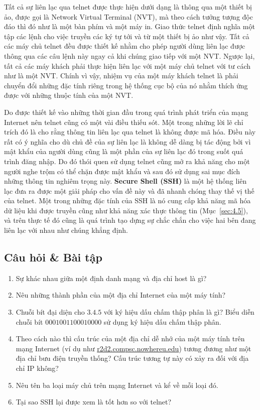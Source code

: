Tất cả sự liên lạc qua telnet được thực hiện dưới dạng là thông qua một thiết bị ảo, được
gọi là Network Virtual Terminal (NVT), mà theo cách tưởng tượng độc đáo thì đó như là một
bàn phím và một máy in. Giao thức telnet định nghĩa một tập các lệnh cho việc truyền các
ký tự tới và từ một thiết bị ảo như vậy. Tất cả các máy chủ telnet đều được thiết kế nhằm
cho phép người dùng liên lạc được thông qua các câu lệnh này ngay cả khi chúng giao tiếp
với một NVT. Ngược lại, tất cả các máy khách phải thực hiện liên lạc với một máy chủ
telnet với tư cách như là một NVT. Chính vì vậy, nhiệm vụ của một máy khách telnet là phải
chuyển đổi những đặc tính riêng trong hệ thống cục bộ của nó nhằm thích ứng được với những
thuộc tính của một NVT.

Do được thiết kế vào những thời gian đầu trong quá trình phát triển của mạng Internet nên
telnet cũng có một vài điều thiếu sót. Một trong những lời lẽ chỉ trích đó là cho rằng
thông tin liên lạc qua telnet là không được mã hóa. Điều này rất có ý nghĩa cho dù chủ đề
của sự liên lạc là không dễ dàng bị tác động bởi vì mật khẩu của người dùng cũng là một
phần của sự liên lạc đó trong suốt quá trình đăng nhập. Do đó thói quen sử dụng telnet
cũng mở ra khả năng cho một người nghe trộm có thể chặn được mật khẩu và sau đó sử dụng
sai mục đích những thông tin nghiêm trọng này. \textbf{Secure Shell (SSH)} là một hệ thống
liên lạc đưa ra được một giải pháp cho vấn đề này và đã nhanh chóng thay thế vị thế của
telnet. Một trong những đặc tính của SSH là nó cung cấp khả năng mã hóa dữ liệu khi được
truyền cũng như khả năng xác thực thông tin (Mục~\ref{sec:4.5}), và trên thực tế đó cũng
là quá trình tạo dựng sự chắc chắn cho việc hai bên đang liên lạc với nhau như chúng khẳng
định.

\subsection*{Câu hỏi \& Bài tập}


\begin{enumerate}
\item Sự khác nhau giữa một định danh mạng và địa chỉ host là gì?
\item Nêu những thành phần của một địa chỉ Internet của một máy tính?
\item Chuỗi bít đại diện cho $3.4.5$ với ký hiệu dấu chấm thập phân là gì?  Biểu diễn
  chuỗi bít $0001001100010000$ sử dụng ký hiệu dấu chấm thập phân.
\item Theo cách nào thì cấu trúc của một địa chỉ dễ nhớ của một máy tính trên mạng
  Internet (ví dụ như \url{r2d2.compsc.nowhereu.edu}) tương đương như một địa chỉ bưu điện
  truyền thống? Cấu trúc tương tự này có xảy ra đối với địa chỉ IP không?
\item Nêu tên ba loại máy chủ trên mạng Internet và kể về mỗi loại đó.
\item Tại sao SSH lại được xem là tốt hơn so với telnet?
\end{enumerate}









